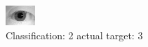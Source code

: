 \begin{figure}[h!]
\begin{center}
\includegraphics[width=0.60\columnwidth]{figures/ID1091_class_2_target_3.png}
\end{center}
\caption{ Classification: 2 actual target: 3}
\label{fig:ID1091_class_2_target_3}
\end{figure}
